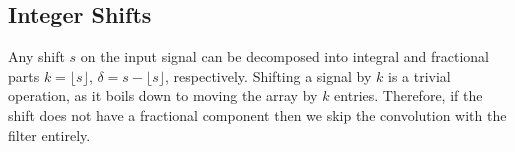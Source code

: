 \documentclass[]{usiinfbachelorproject}
\begin{document}
		
		
		
		\subsection{Integer Shifts} 
		Any shift $s$ on the input signal can be decomposed into integral and fractional parts  $k = \lfloor s \rfloor $, $\delta = s - \lfloor s \rfloor$, respectively.
		Shifting a signal by $k$ is a trivial operation, as it boils down to moving the array by $k$ entries. Therefore, if the shift does not have a fractional component then we skip the convolution with the filter entirely.
		
		
		
		
		
		
		
\end{document}
